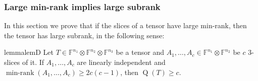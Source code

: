 \documentclass{daj}
\DeclareMathOperator{\subrank}{Q}
\newcommand{\FF}{\mathbb{F}}
\DeclareMathOperator{\minrnk}{min-rank}
\begin{document}
\subsubsection{Large min-rank implies large subrank}\label{subsec:minrank-subrank}

In this section we prove that if the slices of a tensor have large min-rank, then the tensor has large subrank, in the following sense:


\begin{restatable}{lemma}{lemD}
%
\label{cla-high-rank-high-subrank}
Let $T\in\FF^{n_1}\otimes\FF^{n_2}\otimes\FF^{n_3}$ be a tensor and $A_1,\ldots,A_c\in\FF^{n_1}\otimes\FF^{n_2}$ be $c$ 3-slices of it. %
If $A_1,\ldots,A_c$ are linearly independent and  $\minrnk(A_1,\dots,A_c)\geq 2c(c-1)$,
then $\subrank(T)\geq c$.    
%
\end{restatable}
%
%
%
%

%
%
%

%
%
%
%


%

%

%

%
%

%
%
%
\end{document}
